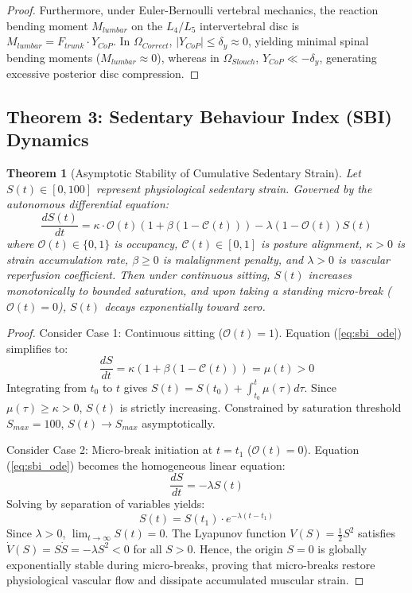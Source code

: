 \documentclass[conference]{IEEEtran}
\newtheorem{theorem}{Theorem}
\begin{document}
\begin{proof}
Furthermore, under Euler-Bernoulli vertebral mechanics, the reaction bending moment $M_{lumbar}$ on the $L_4/L_5$ intervertebral disc is $M_{lumbar} = F_{trunk} \cdot Y_{CoP}$. In $\Omega_{Correct}$, $|Y_{CoP}| \le \delta_y \approx 0$, yielding minimal spinal bending moments ($M_{lumbar} \approx 0$), whereas in $\Omega_{Slouch}$, $Y_{CoP} \ll -\delta_y$, generating excessive posterior disc compression.
\end{proof}

\subsection{Theorem 3: Sedentary Behaviour Index (SBI) Dynamics}
\begin{theorem}[Asymptotic Stability of Cumulative Sedentary Strain]
Let $S(t) \in [0, 100]$ represent physiological sedentary strain. Governed by the autonomous differential equation:
\begin{equation}
\frac{dS(t)}{dt} = \kappa \cdot \mathcal{O}(t) \left(1 + \beta(1 - \mathcal{C}(t))\right) - \lambda (1 - \mathcal{O}(t)) S(t)
\label{eq:sbi_ode}
\end{equation}
where $\mathcal{O}(t) \in \{0, 1\}$ is occupancy, $\mathcal{C}(t) \in [0, 1]$ is posture alignment, $\kappa > 0$ is strain accumulation rate, $\beta \ge 0$ is malalignment penalty, and $\lambda > 0$ is vascular reperfusion coefficient. Then under continuous sitting, $S(t)$ increases monotonically to bounded saturation, and upon taking a standing micro-break ($\mathcal{O}(t) = 0$), $S(t)$ decays exponentially toward zero.
\end{theorem}

\begin{proof}
Consider Case 1: Continuous sitting ($\mathcal{O}(t) = 1$). Equation (\ref{eq:sbi_ode}) simplifies to:
\begin{equation}
\frac{dS}{dt} = \kappa (1 + \beta(1 - \mathcal{C}(t))) = \mu(t) > 0
\end{equation}
Integrating from $t_0$ to $t$ gives $S(t) = S(t_0) + \int_{t_0}^t \mu(\tau) d\tau$. Since $\mu(\tau) \ge \kappa > 0$, $S(t)$ is strictly increasing. Constrained by saturation threshold $S_{max} = 100$, $S(t) \to S_{max}$ asymptotically.

Consider Case 2: Micro-break initiation at $t = t_1$ ($\mathcal{O}(t) = 0$). Equation (\ref{eq:sbi_ode}) becomes the homogeneous linear equation:
\begin{equation}
\frac{dS}{dt} = -\lambda S(t)
\end{equation}
Solving by separation of variables yields:
\begin{equation}
S(t) = S(t_1) \cdot e^{-\lambda(t - t_1)}
\label{eq:exponential_decay}
\end{equation}
Since $\lambda > 0$, $\lim_{t \to \infty} S(t) = 0$. The Lyapunov function $V(S) = \frac{1}{2} S^2$ satisfies $\dot{V}(S) = S \dot{S} = -\lambda S^2 < 0$ for all $S > 0$. Hence, the origin $S = 0$ is globally exponentially stable during micro-breaks, proving that micro-breaks restore physiological vascular flow and dissipate accumulated muscular strain.
\end{proof}
\end{document}
